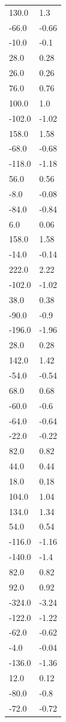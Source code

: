 \begin{longtable}{ll}
130.0 & 1.3 \\
-66.0 & -0.66 \\
-10.0 & -0.1 \\
28.0 & 0.28 \\
26.0 & 0.26 \\
76.0 & 0.76 \\
100.0 & 1.0 \\
-102.0 & -1.02 \\
158.0 & 1.58 \\
-68.0 & -0.68 \\
-118.0 & -1.18 \\
56.0 & 0.56 \\
-8.0 & -0.08 \\
-84.0 & -0.84 \\
6.0 & 0.06 \\
158.0 & 1.58 \\
-14.0 & -0.14 \\
222.0 & 2.22 \\
-102.0 & -1.02 \\
38.0 & 0.38 \\
-90.0 & -0.9 \\
-196.0 & -1.96 \\
28.0 & 0.28 \\
142.0 & 1.42 \\
-54.0 & -0.54 \\
68.0 & 0.68 \\
-60.0 & -0.6 \\
-64.0 & -0.64 \\
-22.0 & -0.22 \\
82.0 & 0.82 \\
44.0 & 0.44 \\
18.0 & 0.18 \\
104.0 & 1.04 \\
134.0 & 1.34 \\
54.0 & 0.54 \\
-116.0 & -1.16 \\
-140.0 & -1.4 \\
82.0 & 0.82 \\
92.0 & 0.92 \\
-324.0 & -3.24 \\
-122.0 & -1.22 \\
-62.0 & -0.62 \\
-4.0 & -0.04 \\
-136.0 & -1.36 \\
12.0 & 0.12 \\
-80.0 & -0.8 \\
-72.0 & -0.72 \\

\end{longtable}
